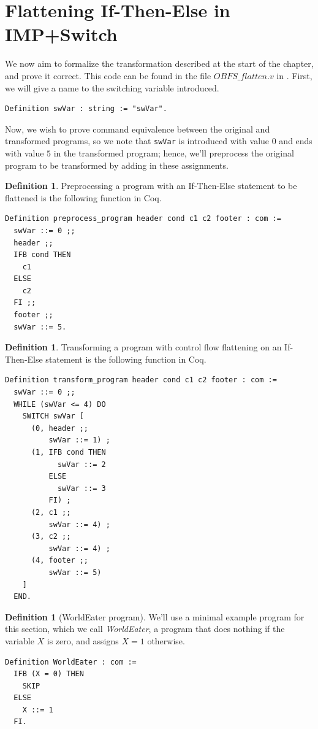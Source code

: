 \documentclass[12pt,notitlepage]{report}
\theoremstyle{plain}
\theoremstyle{definition}
\newtheorem{defin}[theo]{Definition}
\newcommand{\define}[1]{\emph{#1}\index{#1}}
\numberwithin{equation}{section}
\begin{document}
\section{Flattening If-Then-Else in IMP+Switch}\label{flattenif}\label{4.3}
We now aim to formalize the transformation described at the start of the chapter, and prove it correct.  This code can be found in the file $OBFS\_flatten.v$ in  \cite{repo}.  First, we will give a name to the switching variable introduced.

\begin{verbatim}
Definition swVar : string := "swVar".
\end{verbatim}

Now, we wish to prove command equivalence between the original and transformed programs, so we note that \verb$swVar$ is introduced with value $0$ and ends with value $5$ in the transformed program; hence, we'll preprocess the original program to be transformed by adding in these assignments.

\begin{defin}
Preprocessing a program with an If-Then-Else statement to be flattened is the following function in Coq.
\begin{verbatim}
Definition preprocess_program header cond c1 c2 footer : com :=
  swVar ::= 0 ;;
  header ;;
  IFB cond THEN 
    c1 
  ELSE 
    c2 
  FI ;;
  footer ;;
  swVar ::= 5.
\end{verbatim}
\end{defin}

\begin{defin}
Transforming a program with control flow flattening on an If-Then-Else statement is the following function in Coq.
\begin{verbatim}
Definition transform_program header cond c1 c2 footer : com :=
  swVar ::= 0 ;;
  WHILE (swVar <= 4) DO
    SWITCH swVar [
      (0, header ;; 
          swVar ::= 1) ;
      (1, IFB cond THEN
            swVar ::= 2 
          ELSE 
            swVar ::= 3 
          FI) ;
      (2, c1 ;;
          swVar ::= 4) ;
      (3, c2 ;;
          swVar ::= 4) ;
      (4, footer ;;
          swVar ::= 5)
    ]
  END.
\end{verbatim}
\end{defin}

\begin{defin}[WorldEater program]
We'll use a minimal example program for this section, which we call \define{WorldEater}, a program that does nothing if the variable $X$ is zero, and assigns $X=1$ otherwise.

\begin{verbatim}
Definition WorldEater : com :=
  IFB (X = 0) THEN
    SKIP
  ELSE
    X ::= 1
  FI.
\end{verbatim}
\end{defin}
\end{document}
